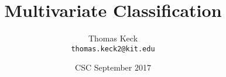 

\title{Multivariate Classification}
\author[T. Keck]{Thomas Keck\\ \texttt{thomas.keck2@kit.edu}}
\date{CSC September 2017}



\begin{frame}
  \titlepage
\end{frame}

































